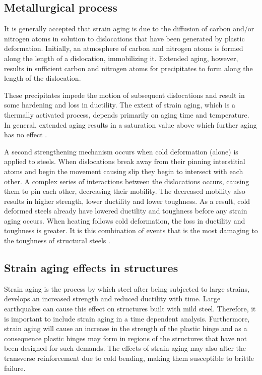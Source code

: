 \subsection{Metallurgical process}

It is generally accepted that strain aging is due to the diffusion of carbon and/or nitrogen atoms in solution to dislocations that have been generated by plastic deformation. Initially, an atmosphere of carbon and nitrogen atoms is formed along the length of a dislocation, immobilizing it. Extended aging, however, results in sufficient carbon and nitrogen atoms for precipitates to form along the length of the dislocation\cite{Overby2017}\cite{Hosseini2015}.

These precipitates impede the motion of subsequent dislocations and result in some hardening and loss in ductility. The extent of strain aging, which is a thermally activated process, depends primarily on aging time and temperature. In general, extended aging results in a saturation value above which further aging has no effect \cite{Restrepo-Posada1994}.

A second strengthening mechanism occurs when cold deformation (alone) is applied to steels. When dislocations break away from their pinning interstitial atoms and begin the movement causing slip they begin to intersect with each other. A complex series of interactions between the dislocations occurs, causing them to pin each other, decreasing their mobility. The decreased mobility also results in higher strength, lower ductility and lower toughness. As a result, cold deformed steels already have lowered ductility and toughness before any strain aging occurs. When heating follows cold deformation, the loss in ductility and toughness is greater. It is this combination of events that is the most damaging to the toughness of structural steels \cite{Momtahan2009}.

\subsection{Strain aging effects in structures}

Strain aging is the process by which steel after being subjected to large strains, develops an increased strength and reduced ductility with time. Large earthquakes can cause this effect on structures built with mild steel. Therefore, it is  important to include strain aging in a time dependent analysis. Furthermore, strain aging will cause an increase in the strength of the plastic hinge and as a consequence plastic hinges may form in regions of the structures that have not been designed for such demands. The effects of strain aging may also alter the transverse reinforcement due to cold bending, making them susceptible to brittle failure\cite{Momtahan2009}.

